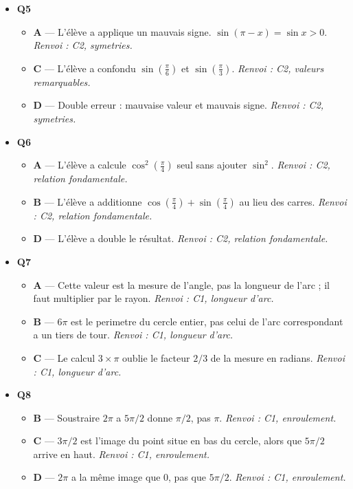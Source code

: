 \begin{itemize}
  \item \textbf{Q5}
  \begin{itemize}
    \item \textbf{A} — L'élève a applique un mauvais signe. $\sin(\pi - x) = \sin x > 0$. \emph{Renvoi : C2, symetries.}
    \item \textbf{C} — L'élève a confondu $\sin(\frac{\pi}{6})$ et $\sin(\frac{\pi}{3})$. \emph{Renvoi : C2, valeurs remarquables.}
    \item \textbf{D} — Double erreur : mauvaise valeur et mauvais signe. \emph{Renvoi : C2, symetries.}
  \end{itemize}
  \item \textbf{Q6}
  \begin{itemize}
    \item \textbf{A} — L'élève a calcule $\cos^2(\frac{\pi}{4})$ seul sans ajouter $\sin^2$. \emph{Renvoi : C2, relation fondamentale.}
    \item \textbf{B} — L'élève a additionne $\cos(\frac{\pi}{4}) + \sin(\frac{\pi}{4})$ au lieu des carres. \emph{Renvoi : C2, relation fondamentale.}
    \item \textbf{D} — L'élève a double le résultat. \emph{Renvoi : C2, relation fondamentale.}
  \end{itemize}
  \item \textbf{Q7}
  \begin{itemize}
    \item \textbf{A} — Cette valeur est la mesure de l'angle, pas la longueur de l'arc ; il faut multiplier par le rayon. \emph{Renvoi : C1, longueur d'arc.}
    \item \textbf{B} — $6\pi$ est le perimetre du cercle entier, pas celui de l'arc correspondant a un tiers de tour. \emph{Renvoi : C1, longueur d'arc.}
    \item \textbf{C} — Le calcul $3\times\pi$ oublie le facteur $2/3$ de la mesure en radians. \emph{Renvoi : C1, longueur d'arc.}
  \end{itemize}
  \item \textbf{Q8}
  \begin{itemize}
    \item \textbf{B} — Soustraire $2\pi$ a $5\pi/2$ donne $\pi/2$, pas $\pi$. \emph{Renvoi : C1, enroulement.}
    \item \textbf{C} — $3\pi/2$ est l'image du point situe en bas du cercle, alors que $5\pi/2$ arrive en haut. \emph{Renvoi : C1, enroulement.}
    \item \textbf{D} — $2\pi$ a la même image que $0$, pas que $5\pi/2$. \emph{Renvoi : C1, enroulement.}

\end{itemize}
\end{itemize}
